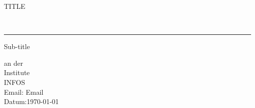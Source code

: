 \begin{titlepage}
	\scshape
	\begin{center}
		\begin{huge}
			TITLE
		\end{huge}
		\\[2mm]
		\hrule
	
	\begin{Large}	
		\vspace*{5cm}
		Sub-title
		\\[10mm]
	\end{Large}
		an der
		\\[5mm]
		Institute
		\\[5cm]
		INFOS
		\\
		Email:	\hfill	 Email
		\\[5mm]
		Datum:\hfill\today

	\end{center}	
\end{titlepage}